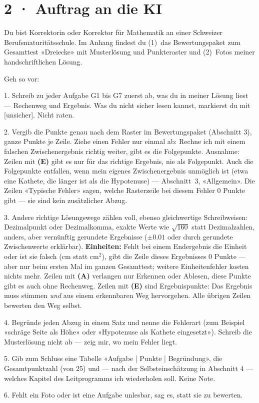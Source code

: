 \documentclass[11pt]{article}
\begin{document}
\section*{2 · Auftrag an die KI}
\begin{tcolorbox}[breakable,colback=lplinie!25,colframe=lplinie,boxrule=0.5pt,arc=1mm,fontupper=\small,left=2mm,right=2mm,top=1.5mm,bottom=1.5mm]
Du bist Korrektorin oder Korrektor für Mathematik an einer Schweizer Berufsmaturitätsschule. Im Anhang findest du (1)~das Bewertungspaket zum Gesamttest «Dreiecke» mit Musterlösung und Punkteraster und (2)~Fotos meiner handschriftlichen Lösung.\par\smallskip
Geh so vor:\par
1. Schreib zu jeder Aufgabe G1 bis G7 zuerst ab, was du in meiner Lösung liest — Rechenweg und Ergebnis. Was du nicht sicher lesen kannst, markierst du mit [unsicher]. Nicht raten.\par
2. Vergib die Punkte genau nach dem Raster im Bewertungspaket (Abschnitt 3), ganze Punkte je Zeile. Ziehe einen Fehler nur einmal ab: Rechne ich mit einem falschen Zwischenergebnis richtig weiter, gibt es die Folgepunkte. Ausnahme: Zeilen mit \textbf{(E)} gibt es nur für das richtige Ergebnis, nie als Folgepunkt. Auch die Folgepunkte entfallen, wenn mein eigenes Zwischenergebnis unmöglich ist (etwa eine Kathete, die länger ist als die Hypotenuse) — Abschnitt~3, «Allgemein». Die Zeilen «Typische Fehler» sagen, welche Rasterzeile bei diesem Fehler 0 Punkte gibt — sie sind kein zusätzlicher Abzug.\par
3. Andere richtige Lösungswege zählen voll, ebenso gleichwertige Schreibweisen: Dezimalpunkt oder Dezimalkomma, exakte Werte wie $\sqrt{160}$ statt Dezimalzahlen, anders, aber vernünftig gerundete Ergebnisse ($\pm 0.01$ oder durch gerundete Zwischenwerte erklärbar). \textbf{Einheiten:} Fehlt bei einem Endergebnis die Einheit oder ist sie falsch ($\text{cm}$ statt $\text{cm}^2$), gibt die Zeile dieses Ergebnisses 0 Punkte — aber nur beim ersten Mal im ganzen Gesamttest; weitere Einheitenfehler kosten nichts mehr. Zeilen mit \textbf{(A)} verlangen nur Erkennen oder Ablesen, diese Punkte gibt es auch ohne Rechenweg. Zeilen mit \textbf{(E)} sind Ergebnispunkte: Das Ergebnis muss stimmen \emph{und} aus einem erkennbaren Weg hervorgehen. Alle übrigen Zeilen bewerten den Weg selbst.\par
4. Begründe jeden Abzug in einem Satz und nenne die Fehlerart (zum Beispiel «schräge Seite als Höhe» oder «Hypotenuse als Kathete eingesetzt»). Schreib die Musterlösung nicht ab — zeig mir, wo mein Fehler liegt.\par
5. Gib zum Schluss eine Tabelle «Aufgabe | Punkte | Begründung», die Gesamtpunktzahl (von 25) und — nach der Selbsteinschätzung in Abschnitt 4 — welches Kapitel des Leitprogramms ich wiederholen soll. Keine Note.\par
6. Fehlt ein Foto oder ist eine Aufgabe unlesbar, sag es, statt sie zu bewerten.
\end{tcolorbox}
\end{document}
